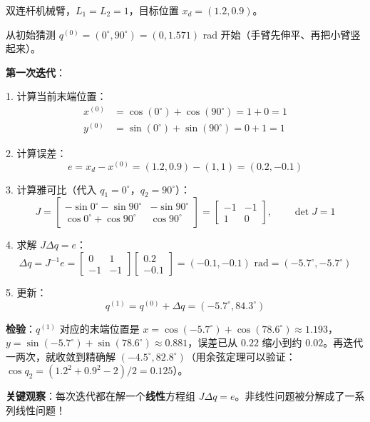 \begin{example}[牛顿迭代的手算演示]
双连杆机械臂，$L_1 = L_2 = 1$，目标位置 $x_d = (1.2, 0.9)$。

从初始猜测 $q^{(0)} = (0^\circ, 90^\circ) = (0, 1.571)$ rad 开始（手臂先伸平、再把小臂竖起来）。

\textbf{第一次迭代}：

1. 计算当前末端位置：
\begin{align}
x^{(0)} &= \cos(0^\circ) + \cos(90^\circ) = 1 + 0 = 1 \\
y^{(0)} &= \sin(0^\circ) + \sin(90^\circ) = 0 + 1 = 1
\end{align}

2. 计算误差：
\[
e = x_d - x^{(0)} = (1.2, 0.9) - (1, 1) = (0.2, -0.1)
\]

3. 计算雅可比（代入 $q_1 = 0^\circ$，$q_2 = 90^\circ$）：
\[
J = \begin{bmatrix}
-\sin 0^\circ - \sin 90^\circ & -\sin 90^\circ \\
\cos 0^\circ + \cos 90^\circ & \cos 90^\circ
\end{bmatrix}
= \begin{bmatrix}
-1 & -1 \\
1 & 0
\end{bmatrix}, \qquad \det J = 1
\]

4. 求解 $J \Delta q = e$：
\[
\Delta q = J^{-1} e = \begin{bmatrix} 0 & 1 \\ -1 & -1 \end{bmatrix} \begin{bmatrix} 0.2 \\ -0.1 \end{bmatrix} = (-0.1, -0.1) \text{ rad} = (-5.7^\circ, -5.7^\circ)
\]

5. 更新：
\[
q^{(1)} = q^{(0)} + \Delta q = (-5.7^\circ, 84.3^\circ)
\]

\textbf{检验}：$q^{(1)}$ 对应的末端位置是 $x = \cos(-5.7^\circ) + \cos(78.6^\circ) \approx 1.193$，$y = \sin(-5.7^\circ) + \sin(78.6^\circ) \approx 0.881$，误差已从 $0.22$ 缩小到约 $0.02$。再迭代一两次，就收敛到精确解 $(-4.5^\circ, 82.8^\circ)$（用余弦定理可以验证：$\cos q_2 = (1.2^2 + 0.9^2 - 2)/2 = 0.125$）。

\textbf{关键观察}：每次迭代都在解一个\textbf{线性}方程组 $J \Delta q = e$。非线性问题被分解成了一系列线性问题！
\end{example}


